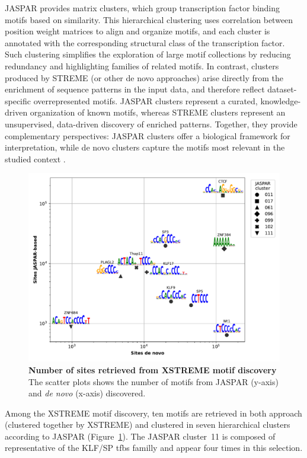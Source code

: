 \documentclass[11pt]{book}
\begin{document}
JASPAR provides matrix clusters, which group transcription factor binding motifs based on similarity. This hierarchical clustering uses correlation between position weight matrices to align and organize motifs, and each cluster is annotated with the corresponding structural class of the transcription factor. Such clustering simplifies the exploration of large motif collections by reducing redundancy and highlighting families of related motifs. In contrast, clusters produced by STREME (or other de novo approaches) arise directly from the enrichment of sequence patterns in the input data, and therefore reflect dataset-specific overrepresented motifs. JASPAR clusters represent a curated, knowledge-driven organization of known motifs, whereas STREME clusters represent an unsupervised, data-driven discovery of enriched patterns. Together, they provide complementary perspectives: JASPAR clusters offer a biological framework for interpretation, while de novo clusters capture the motifs most relevant in the studied context \cite{jaspar_matrix_clusters, rauluseviciute_jaspar_2024}.


\begin{figure}[htbp]
    \centering
    \includegraphics[width=\textwidth]{Figures/Results/common_xstreme_motif_scatterplot.pdf}
    \caption{\textbf{Number of sites retrieved from XSTREME motif discovery} The scatter plots shows the number of motifs from JASPAR (y-axis) and \textit{de novo} (x-axis) discovered.}
    \label{fig:common_scat_xstreme}
\end{figure}

Among the XSTREME motif discovery, ten motifs are retrieved in both approach (clustered together by XSTREME) and clustered in seven hierarchical clusters according to JASPAR (Figure~\ref{fig:common_scat_xstreme}). The JASPAR cluster~11 is composed of representative of the KLF/SP \gls{tfbs} familly and appear four times in this selection.
\end{document}
